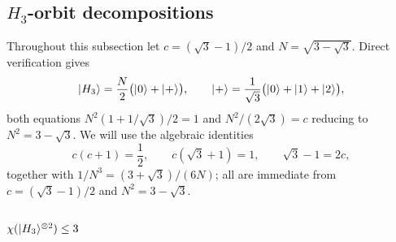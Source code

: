 \documentclass[11pt]{article}
\theoremstyle{definition}
\newcommand{\microspace}{\mspace{0.5mu}}
\newcommand{\ket}[1]{\lvert\microspace #1 \microspace \rangle}
\newcommand{\chiR}{\chi}
\newcommand{\Hth}{\ket{H_3}}
\begin{document}
	\subsection{\texorpdfstring{$H_3$-orbit decompositions}{H\_3-orbit decompositions}}\label{app:h3}
	
	Throughout this subsection let $c = (\sqrt 3 - 1)/2$ and
	$N = \sqrt{3 - \sqrt 3}$. Direct verification gives
	\begin{equation}\label{eq:h3-factor}
		\Hth = \frac{N}{2}\big( \ket{0} + \ket{+} \big),
		\qquad \ket{+} = \frac{1}{\sqrt 3}\big( \ket{0} + \ket{1} + \ket{2} \big),
	\end{equation}
	both equations $N^2 (1 + 1/\sqrt 3)/2 = 1$ and $N^2/(2\sqrt 3) = c$
	reducing to $N^2 = 3 - \sqrt 3$. We will use the algebraic identities
	\begin{equation}\label{eq:h3-identities}
		c(c + 1) = \frac{1}{2}, \qquad
		c(\sqrt 3 + 1) = 1, \qquad
		\sqrt 3 - 1 = 2c,
	\end{equation}
	together with $1/N^3 = (3 + \sqrt 3)/(6 N)$; all are immediate from
	$c = (\sqrt 3 - 1)/2$ and $N^2 = 3 - \sqrt 3$.
	
	\subsubsection{\texorpdfstring{$\chiR(\Hth^{\otimes 2}) \le 3$}{chi(H3 tensor 2) <= 3}}\label{app:h3-m2}
	
\end{document}
